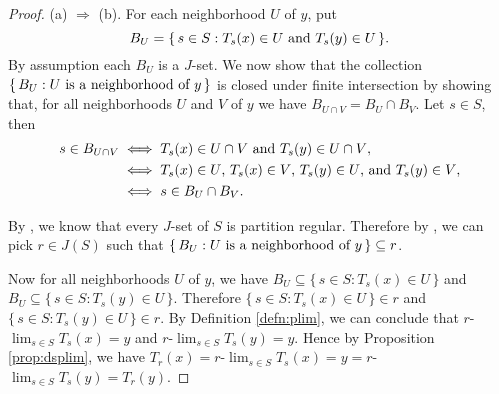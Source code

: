 \documentclass[12pt]{article}
\theoremstyle{plain}
\theoremstyle{definition}
\begin{document}
  \begin{proof}
    (a) $\Rightarrow$ (b). 
    For each neighborhood $U$ of $y$, put 
      \[  
        B_U = \{\, s \in S : \hbox{$T_s(x) \in U$ and $T_s(y) \in U$}
        \,\}.
      \]
    By assumption each $B_U$ is a $J$-set. 
    We now show that the collection $\{\, B_U : \hbox{$U$ is a
      neighborhood of $y$} \,\}$ is closed under finite intersection
    by showing that, for all neighborhoods $U$ and $V$ of $y$ we have $B_{U
      \cap V} = B_U \cap B_V$.
    Let $s \in S$, then 
      \begin{align*}
        s \in B_{U \cap V} &\iff \hbox{$T_s(x) \in U \cap V$ and $T_s(y) \in U
        \cap V$}, \\
      &\iff \hbox{$T_s(x) \in U$, $T_s(x) \in V$, $T_s(y) \in U$, and
        $T_s(y) \in V$}, \\
      &\iff s \in B_U \cap B_V.
      \end{align*}
    
    By \cite[Theorem 2.14]{Hindman:2010fk}, we know that every $J$-set
    of $S$ is partition regular. 
    Therefore by \cite[Theorem 3.11 (b)]{Hindman:1998fk},  we can pick 
    $r \in J(S)$ such that $\{\, B_U : \hbox{$U$ is a neighborhood of
      $y$}\,\} \subseteq r$. 
    
    Now for all neighborhoods $U$ of $y$, we have $B_U \subseteq \{\,
    s \in S : T_s(x) \in U \,\}$ and $B_U \subseteq \{\, s \in S :
    T_s(y) \in U \,\}$. 
    Therefore $\{\, s \in S : T_s(x) \in U\,\} \in r$ and $\{\, s \in
    S : T_s(y) \in U \,\} \in r$. 
    By Definition \ref{defn:plim}, we can conclude that
    $r$-$\displaystyle\lim_{s\in S} T_s(x) = y$ and
    $r$-$\displaystyle\lim_{s \in S} T_s(y) = y$. 
    Hence by Proposition \ref{prop:dsplim}, we have $T_r(x) =
    r$-$\displaystyle\lim_{s \in S} T_s(x) = y = r$-$\displaystyle\lim_{s \in S}
    T_s(y) = T_r(y)$.
  

\end{proof}
\end{document}
